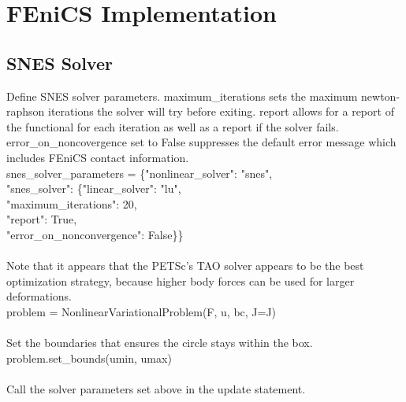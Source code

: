 \documentclass[12pt,3p]{article}
\begin{document}
\section{FEniCS Implementation}
\vspace{-2ex}

\subsection{SNES Solver} 
Define SNES solver parameters. {\selectfont maximum\_iterations} sets the maximum newton-raphson iterations the solver will try before exiting. {\selectfont report} allows for a report of the functional for each iteration as well as a report if the solver fails. {\selectfont error\_on\_noncovergence} set to False suppresses the default error message which includes FEniCS contact information. \\
{\selectfont
snes\_solver\_parameters = \{"nonlinear\_solver": "snes", \\
\indent \indent \indent \indent \indent \indent \indent \indent \indent \indent \indent "snes\_solver": \{"linear\_solver": "lu",	\\
\indent \indent \indent \indent \indent \indent \indent \indent \indent \indent \indent \indent \indent \indent \indent "maximum\_iterations": 20, \\
\indent \indent \indent \indent \indent \indent \indent \indent \indent \indent \indent \indent \indent \indent \indent "report": True, \\
\indent \indent \indent \indent \indent \indent \indent \indent \indent \indent \indent \indent \indent \indent \indent "error\_on\_nonconvergence": False\}\} \\ \\
}
Note that it appears that the PETSc's TAO solver appears to be the best optimization strategy, because higher body forces can be used for larger deformations. \\
{\selectfont
problem = NonlinearVariationalProblem(F, u, bc, J=J) \\ \\
} 
Set the boundaries that ensures the circle stays within the box. \\
{\selectfont
problem.set\_bounds(umin, umax) \\ \\
}
Call the solver parameters set above in the update statement. \\
\end{document}
